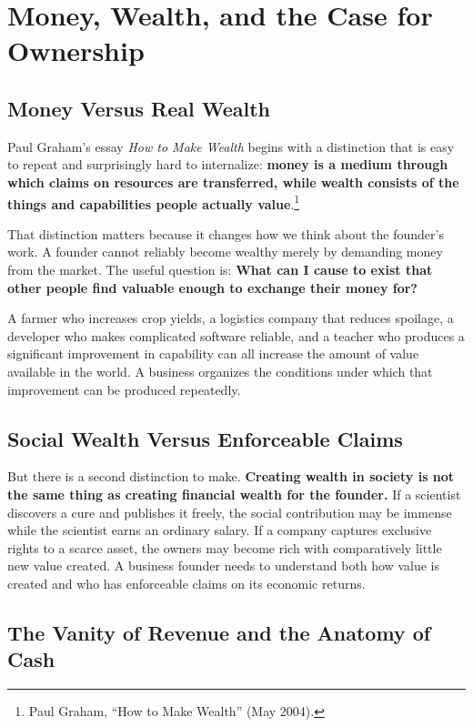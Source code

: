\section{Money, Wealth, and the Case for Ownership}

\subsection{Money Versus Real Wealth}

Paul Graham's essay \textit{How to Make Wealth} begins with a distinction that is easy to repeat and surprisingly hard to internalize: \textbf{money is a medium through which claims on resources are transferred, while wealth consists of the things and capabilities people actually value}.\footnote{Paul Graham, ``How to Make Wealth'' (May 2004).}

That distinction matters because it changes how we think about the founder's work. A founder cannot reliably become wealthy merely by demanding money from the market. The useful question is: \textbf{What can I cause to exist that other people find valuable enough to exchange their money for?}

A farmer who increases crop yields, a logistics company that reduces spoilage, a developer who makes complicated software reliable, and a teacher who produces a significant improvement in capability can all increase the amount of value available in the world. A business organizes the conditions under which that improvement can be produced repeatedly.

\subsection{Social Wealth Versus Enforceable Claims}

But there is a second distinction to make. \textbf{Creating wealth in society is not the same thing as creating financial wealth for the founder.} If a scientist discovers a cure and publishes it freely, the social contribution may be immense while the scientist earns an ordinary salary. If a company captures exclusive rights to a scarce asset, the owners may become rich with comparatively little new value created. A business founder needs to understand both how value is created and who has enforceable claims on its economic returns.

\subsection{The Vanity of Revenue and the Anatomy of Cash}

